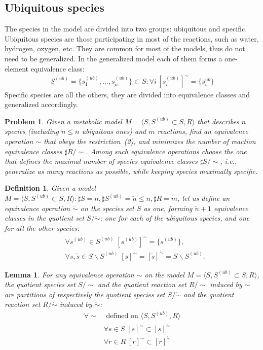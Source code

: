 \documentclass[10pt]{bmc_article}
\newenvironment{bmcformat}{\baselineskip20pt\sloppy\setboolean{publ}{false}}{\baselineskip20pt\sloppy}
\begin{document}
\begin{bmcformat}
\subsection*{Ubiquitous species}
The species in the model are divided into two groups: ubiquitous and specific. Ubiquitous species are those participating in most of the reactions, such as water, hydrogen, oxygen, etc. They are common for most of the models, thus do not need to be generalized. In the generalized model each of them forms a one-element equivalence class:
\begin{align*}
S^{(ub)} = \{s^{(ub)}_1, \ldots, s^{(ub)}_{\breve{n}}\} \subset S: \forall i\,[s^{(ub)}_i]^{\sim} = \{s^{ub}_i\}
\end{align*}
 Specific species are all the others, they are divided into equivalence classes and generalized accordingly.  

\newtheorem{p0}[pbm]{Problem}
\begin{p0}
Given a metabolic model $M=\langle S, S^{(ub)} \subset S, R \rangle$ that describes $n$ species (including $\breve{n} \leq n$ ubiquitous ones) and $m$ reactions, find an equivalence operation $\sim$ that obeys the restriction~(2), and minimizes the number of reaction equivalence classes $\sharp R/\sim$. Among such equivalence operations choose the one that defines the maximal number of species equivalence classes $\sharp S/\sim$, i.e., generalize as many reactions as possible, while keeping species maximally specific.
\end{p0}
\newtheorem{eq0}[def]{Definition}
\begin{eq0}
Given a model $M=\langle S, S^{(ub)}\subset{S}, R \rangle : \sharp S = n, \sharp S^{(ub)}=\breve{n} \leq n, \sharp R = m$, let us define an equivalence operation $\mathring{\sim}$ on the species set $S$ as one, forming $\breve{n} + 1$ equivalence classes in the quotient set $S/\mathring{\sim}$: one for each of the ubiquitous species, and one for all the other species:
\begin{align*}
&\forall s^{(ub)} \in S^{(ub)} \;[s^{(ub)}]^{\mathring{\sim}} = \{s^{(ub)}\}, \\
&\forall s, \tilde{s} \in S\backslash S^{(ub)} \;[s]^{\mathring{\sim} } = [\tilde{s}]^{\mathring{\sim} } = S \backslash S^{(ub)}.
\end{align*}
\end{eq0}
\newtheorem{l1}[lm]{Lemma}
\begin{l1}
For any equivalence operation $\sim$ on the model $M=\langle S, S^{(ub)} \subset S, R \rangle$, the quotient species set $S/\sim$ and the quotient reaction set $R/\sim$ induced by $\sim$ are partitions of respectively the quotient species set $S/\mathring{\sim}$ and the quotient reaction set $R/\mathring{\sim} $ induced by $\mathring{\sim}$:
\begin{align*}
\forall \sim &\text{ defined on }\langle S, S^{(ub)}, R \rangle\\
&\forall s \in S \; [s]^{\sim} \subset [s]^{\mathring{\sim}} \\
&\forall r \in R \; [r]^{\sim} \subset [r]^{\mathring{\sim}} 
\end{align*}
\end{l1}


\end{bmcformat}
\end{document}
